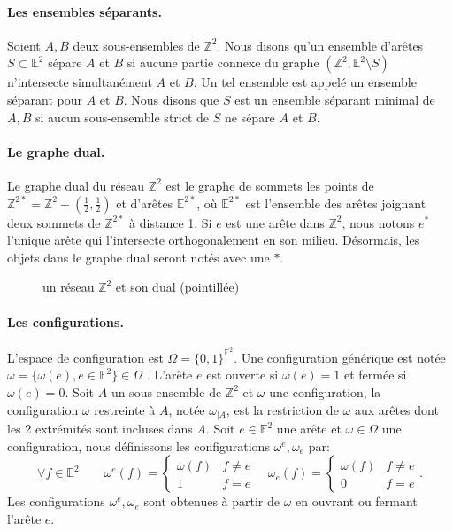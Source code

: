 \documentclass[titlepage,a4paper,12pt]{article}
\begin{document}
\paragraph{Les ensembles séparants.} Soient $A,B$ deux sous-ensembles de $\mathbb{Z}^2$. Nous disons qu'un ensemble d'arêtes $S\subset \mathbb{E}^2$ sépare $A$ et $B$ si aucune partie connexe du graphe $(\mathbb{Z}^2,\mathbb{E}^2 \setminus S)$ n'intersecte simultanément $A$ et $B$. Un tel ensemble est appelé un ensemble séparant pour $A$ et $B$. Nous disons que $S$ est un ensemble séparant minimal de $A,B$ si aucun sous-ensemble strict de $S$ ne sépare $A$ et $B$.

\paragraph{Le graphe dual.}Le graphe dual du réseau $\mathbb{Z}^2$ est le graphe de sommets les points de $ \mathbb{Z}^{2*} = \mathbb{Z}^2+(\frac{1}{2},\frac{1}{2})$ et d'arêtes $\mathbb{E}^{2*}$, où $\mathbb{E}^{2*}$ est l'ensemble des arêtes joignant deux sommets de $\mathbb{Z}^{2*}$ à distance 1. Si $e$ est une arête dans $\mathbb{Z}^2$, nous notons $e^*$ l'unique arête qui l'intersecte orthogonalement en son milieu. Désormais, les objets dans le graphe dual seront notés avec une $*$.
\begin{figure}[h]
\center
{}
\caption{un réseau $\mathbb{Z}^2$ et son dual (pointillée)}
\end{figure}

\paragraph{Les configurations.} L'espace de configuration est $\Omega = \{0,1\}^{\mathbb{E}^2}$. Une configuration générique est notée $\omega = \{\omega(e), e\in \mathbb{E}^2\} \in \Omega$ . L'arête $e$ est ouverte si $\omega(e) = 1$ et fermée si $\omega(e)= 0$. 
Soit $A$ un sous-ensemble de $\mathbb{Z}^2$ et $\omega$ une configuration, la configuration $\omega$ restreinte à $A$, notée $\omega_{\mid A}$, est la restriction de $\omega$ aux arêtes dont les 2 extrémités sont incluses dans $A$.
Soit $e\in \mathbb{E}^2$ une arête et $\omega\in \Omega$ une configuration, nous définissons les configurations $\omega^e,\omega_e$ par:
$$
 \forall f\in \mathbb{E}^2 \qquad\omega^e(f) = \left\lbrace \begin{array}{cc}
	\omega(f) & f\neq e \\
	1 & f=e 
 \end{array}\right. \quad
 \omega_e(f) = \left\lbrace \begin{array}{cc}
	\omega(f) & f\neq e \\
	0 & f=e
 \end{array}\right..
$$
Les configurations $\omega^e,\omega_e$ sont obtenues à partir de $\omega$ en ouvrant ou fermant l'arête $e$.
\end{document}
